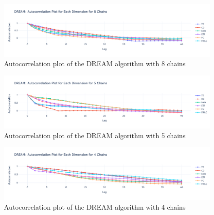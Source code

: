 \begin{figure}[H]
    \centering
    \includegraphics[width=1\textwidth]{figures/dream/ac_8.png}
    \captionsetup{width=.8\textwidth}
    \caption{Autocorrelation plot of the DREAM algorithm with 8 chains}
    \label{fig:enter-label}
\end{figure}

\begin{figure}[H]
    \centering
    \includegraphics[width=1\textwidth]{figures/dream/ac_5.png}
    \captionsetup{width=.8\textwidth}
    \caption{Autocorrelation plot of the DREAM algorithm with 5 chains}
    \label{fig:enter-label}
\end{figure}

\begin{figure}[H]
    \centering
    \includegraphics[width=1\textwidth]{figures/dream/ac_4.png}
    \captionsetup{width=.8\textwidth}
    \caption{Autocorrelation plot of the DREAM algorithm with 4 chains}
    \label{fig:enter-label}
\end{figure}



